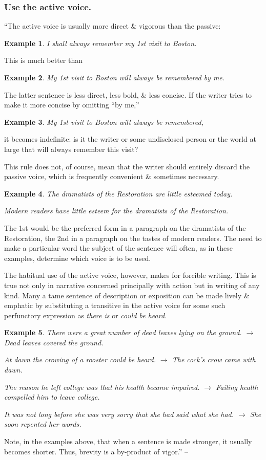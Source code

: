\documentclass{article}
\newtheorem{example}{Example}
\begin{document}

\subsubsection{Use the active voice.}
``The active voice is usually more direct \& vigorous than the passive:
\begin{example}
	I shall always remember my 1st visit to Boston.
\end{example}
This is much better than
\begin{example}
	My 1st visit to Boston will always be remembered by me.
\end{example}
The latter sentence is less direct, less bold, \& less concise. If the writer tries to make it more concise by omitting ``by me,''
\begin{example}
	My 1st visit to Boston will always be remembered,
\end{example}
it becomes indefinite: is it the writer or some undisclosed person or the world at large that will always remember this visit?

This rule does not, of course, mean that the writer should entirely discard the passive voice, which is frequently convenient \& sometimes necessary.
\begin{example}
	The dramatists of the Restoration are little esteemed today.
	
	Modern readers have little esteem for the dramatists of the Restoration.
\end{example}
The 1st would be the preferred form in a paragraph on the dramatists of the Restoration, the 2nd in a paragraph on the tastes of modern readers. The need to make a particular word the subject of the sentence will often, as in these examples, determine which voice is to be used.

The habitual use of the active voice, however, makes for forcible writing. This is true not only in narrative concerned principally with action but in writing of any kind. Many a tame sentence of description or exposition can be made lively \& emphatic by substituting a transitive in the active voice for some such perfunctory expression as {\it there is} or {\it could be heard}.
\begin{example}
	There were a great number of dead leaves lying on the ground. $\to$ Dead leaves covered the ground.
	
	At dawn the crowing of a rooster could be heard. $\to$ The cock's crow came with dawn.
	
	The reason he left college was that his health became impaired. $\to$ Failing health compelled him to leave college.
	
	It was not long before she was very sorry that she had said what she had. $\to$ She soon repented her words.
\end{example}
Note, in the examples above, that when a sentence is made stronger, it usually becomes shorter. Thus, brevity is a by-product of vigor.'' -- \cite[p. 32]{Strunk_White_element_style}
\end{document}
